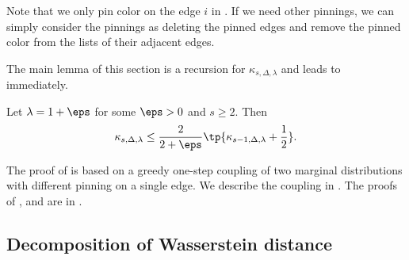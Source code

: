 \documentclass[a4paper,11pt]{article}
\begin{document}
Note that we only pin color on the edge $i$ in . If we need other pinnings, we can simply consider the pinnings as deleting the pinned edges and remove the pinned color from the lists of their adjacent edges.


The main lemma of this section is a recursion for $\kappa_{s, \Delta, \lambda}$
and leads to  immediately.

\begin{lemma}\label{lem:kappa-recursion}
    Let $\lambda=1+\eps$ for some $\eps>0$ and $s\ge 2$. Then
    \[
    \kappa_{s, \Delta, \lambda} \le \frac{2}{2+\eps}\tp{\kappa_{s-1, \Delta, \lambda} + \frac12}.
    \]
\end{lemma}

The proof of  is based on a greedy one-step coupling of two marginal distributions with different pinning on a single edge. We describe the coupling in . The proofs of ,  and  are in .


\subsection{Decomposition of Wasserstein distance}\label{sec:coupling}
\end{document}
